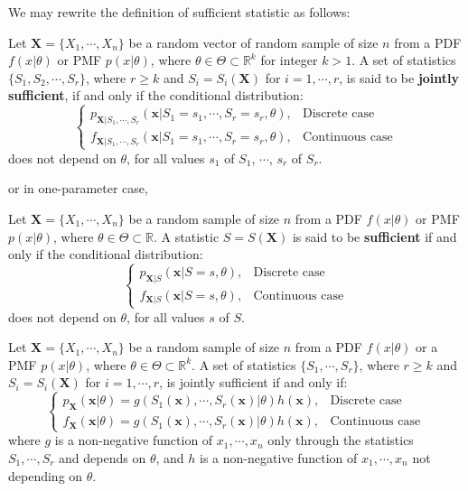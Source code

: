 \documentclass{huhtakm-template-book-v2}
\begin{document}
We may rewrite the definition of sufficient statistic as follows:
\begin{defn}
	Let $\mathbf{X}=\{X_{1},\cdots,X_{n}\}$ be a random vector of random sample of size $n$ from a PDF $f(x|\theta)$ or PMF $p(x|\theta)$, where $\theta\in\Theta\subset\mathbb{R}^{k}$ for integer $k>1$. A set of statistics $\{S_{1},S_{2},\cdots,S_{r}\}$, where $r\geq k$ and $S_{i}=S_{i}(\mathbf{X})$ for $i=1,\cdots,r$, is said to be \textbf{jointly sufficient}, if and only if the conditional distribution:
	\begin{equation*}
		\begin{cases}
			p_{\mathbf{X}|S_{1},\cdots,S_{r}}(\mathbf{x}|S_{1}=s_{1},\cdots,S_{r}=s_{r},\theta), &\text{Discrete case}\\
			f_{\mathbf{X}|S_{1},\cdots,S_{r}}(\mathbf{x}|S_{1}=s_{1},\cdots,S_{r}=s_{r},\theta), &\text{Continuous case}
		\end{cases}
	\end{equation*}
	does not depend on $\theta$, for all values $s_{1}$ of $S_{1}$, $\cdots$, $s_{r}$ of $S_{r}$.
\end{defn}
or in one-parameter case,
\begin{defn}
	Let $\mathbf{X}=\{X_{1},\cdots,X_{n}\}$ be a random sample of size $n$ from a PDF $f(x|\theta)$ or PMF $p(x|\theta)$, where $\theta\in\Theta\subset\mathbb{R}$. A statistic $S=S(\mathbf{X})$ is said to be \textbf{sufficient} if and only if the conditional distribution:
	\begin{equation*}
		\begin{cases}
			p_{\mathbf{X}|S}(\mathbf{x}|S=s,\theta), &\text{Discrete case}\\
			f_{\mathbf{X}|S}(\mathbf{x}|S=s,\theta), &\text{Continuous case}
		\end{cases}
	\end{equation*}
	does not depend on $\theta$, for all values $s$ of $S$.
\end{defn}
\begin{thm}
	Let $\mathbf{X}=\{X_{1},\cdots,X_{n}\}$ be a random sample of size $n$ from a PDF $f(x|\theta)$ or a PMF $p(x|\theta)$, where $\theta\in\Theta\subset\mathbb{R}^{k}$. A set of statistics $\{S_{1},\cdots,S_{r}\}$, where $r\geq k$ and $S_{i}=S_{i}(\mathbf{X})$ for $i=1,\cdots,r$, is jointly sufficient if and only if:
	\begin{equation*}
		\begin{cases}
			p_{\mathbf{X}}(\mathbf{x}|\theta)=g(S_{1}(\mathbf{x}),\cdots,S_{r}(\mathbf{x})|\theta)h(\mathbf{x}), &\text{Discrete case}\\
			f_{\mathbf{X}}(\mathbf{x}|\theta)=g(S_{1}(\mathbf{x}),\cdots,S_{r}(\mathbf{x})|\theta)h(\mathbf{x}), &\text{Continuous case}
		\end{cases}
	\end{equation*}
	where $g$ is a non-negative function of $x_{1},\cdots,x_{n}$ only through the statistics $S_{1},\cdots,S_{r}$ and depends on $\theta$, and $h$ is a non-negative function of $x_{1},\cdots,x_{n}$ not depending on $\theta$.
\end{thm}
\end{document}

